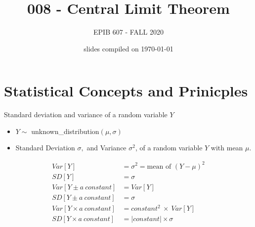 \documentclass[10pt]{beamer}\usepackage[]{graphicx}\usepackage[]{color}
\begin{document}

	\title{008 - Central Limit Theorem}
\author{EPIB 607 - FALL 2020}

\date{slides compiled on \today}

\maketitle

\section{Statistical Concepts and Prinicples}


\begin{frame}{Standard deviation and variance of a random variable $Y$}
	\begin{itemize}
		\tightlist
		\item $Y \sim$ unknown\_distribution$(\mu, \sigma)$
		\item Standard Deviation \(\sigma,\) and Variance \(\sigma^2\), of a random variable \(Y\) with mean \(\mu\).
	\end{itemize}

\begin{align*}
Var[Y] &= \sigma^2 = \textrm{mean of } (Y - \mu)^2 \\
SD[Y] &= \sigma \\
Var[Y \pm a \ constant] &= Var[Y] \\
SD[Y \pm a \ constant] &= \sigma \\
Var[Y \times a \ constant] &= constant^2 \ \times \ Var[Y] \\
SD[Y \times a \ constant] &= |constant| \times \sigma
\end{align*}	


\end{frame}
\end{document}
